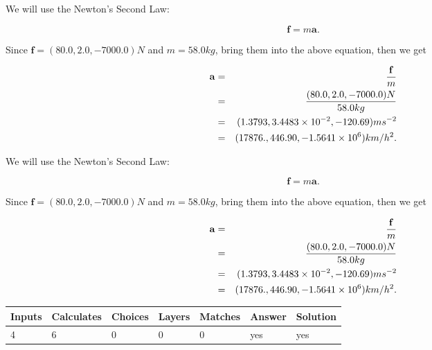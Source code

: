 \documentclass[12pt]{article}
\begin{document}
We will use the Newton's Second Law:
 
\[
\mathbf{f}=m\mathbf{a}.
\]
 
Since $\mathbf{f}=( %
80.0,  %
2.0,  %
-7000.0 )N$
and $m= %
58.0 kg$, bring them into the above equation, then we get
 
\begin{eqnarray*}
\mathbf{a}&=&\frac{\mathbf{f}}m  \\
&=&\frac{(
80.0 ,
2.0 ,
-7000.0 )N
}{ %
58.0 kg}  \\
&=&(
1.3793 ,
3.4483 \times 10^{-2},
-120.69
)ms^{-2} \\
&=&(
17876. ,
446.90 ,
-1.5641 \times 10^{6}
)km/h^2.
\end{eqnarray*}
 
 
 
\noindent{}
 
 

 
 
 
\noindent{}
 
 

We will use the Newton's Second Law:
 
\[
\mathbf{f}=m\mathbf{a}.
\]
 
Since $\mathbf{f}=( %
80.0,  %
2.0,  %
-7000.0 )N$
and $m= %
58.0 kg$, bring them into the above equation, then we get
 
\begin{eqnarray*}
\mathbf{a}&=&\frac{\mathbf{f}}m  \\
&=&\frac{(
80.0 ,
2.0 ,
-7000.0 )N
}{ %
58.0 kg}  \\
&=&(
1.3793 ,
3.4483 \times 10^{-2},
-120.69
)ms^{-2} \\
&=&(
17876. ,
446.90 ,
-1.5641 \times 10^{6}
)km/h^2.
\end{eqnarray*}
 
 
 
\noindent{}
 
 

 
\vspace{0.3in}
   
   
   
   
\noindent\begin{tabular}{|l|l|l|l|l|l|l|}
 \hline
Inputs & Calculates & Choices & Layers & Matches & Answer & Solution \\ \hline
           4  & 
           6  & 
           0
  & 
           0  & 
           0  & 
  yes & 
  yes 
  \\ \hline
 \end{tabular}
   
\end{document}
